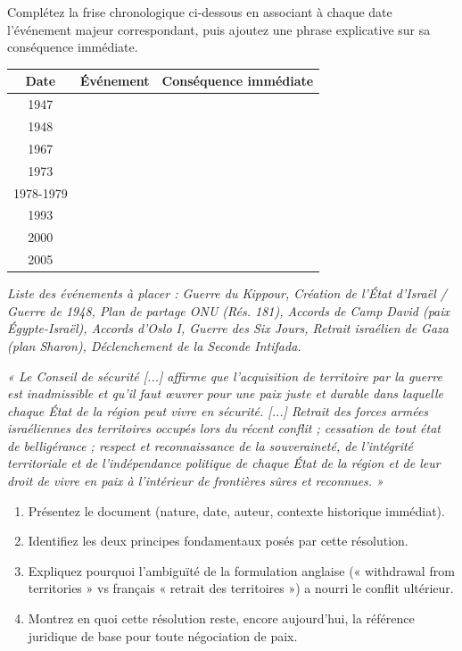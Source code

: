 \documentclass[11pt]{article}
\begin{document}
\begin{exercice}
Complétez la frise chronologique ci-dessous en associant à chaque date l'événement majeur correspondant, puis ajoutez une phrase explicative sur sa conséquence immédiate.
\begin{center}
\begin{tabularx}{\linewidth}{|c|X|X|}\hline
\textbf{Date} & \textbf{Événement} & \textbf{Conséquence immédiate} \\ \hline
1947 & & \\ \hline
1948 & & \\ \hline
1967 & & \\ \hline
1973 & & \\ \hline
1978-1979 & & \\ \hline
1993 & & \\ \hline
2000 & & \\ \hline
2005 & & \\ \hline
\end{tabularx}
\end{center}
\textit{Liste des événements à placer : Guerre du Kippour, Création de l'État d'Israël / Guerre de 1948, Plan de partage ONU (Rés. 181), Accords de Camp David (paix Égypte-Israël), Accords d'Oslo I, Guerre des Six Jours, Retrait israélien de Gaza (plan Sharon), Déclenchement de la Seconde Intifada.}
\end{exercice}

\begin{exercice}
\textit{« Le Conseil de sécurité [...] affirme que l'acquisition de territoire par la guerre est inadmissible et qu'il faut œuvrer pour une paix juste et durable dans laquelle chaque État de la région peut vivre en sécurité. [...] Retrait des forces armées israéliennes des territoires occupés lors du récent conflit ; cessation de tout état de belligérance ; respect et reconnaissance de la souveraineté, de l'intégrité territoriale et de l'indépendance politique de chaque État de la région et de leur droit de vivre en paix à l'intérieur de frontières sûres et reconnues. »}
\begin{enumerate}
    \item Présentez le document (nature, date, auteur, contexte historique immédiat).
    \item Identifiez les deux principes fondamentaux posés par cette résolution.
    \item Expliquez pourquoi l'ambiguïté de la formulation anglaise (« withdrawal from territories » vs français « retrait des territoires ») a nourri le conflit ultérieur.
    \item Montrez en quoi cette résolution reste, encore aujourd'hui, la référence juridique de base pour toute négociation de paix.
\end{enumerate}
\end{exercice}
\end{document}
